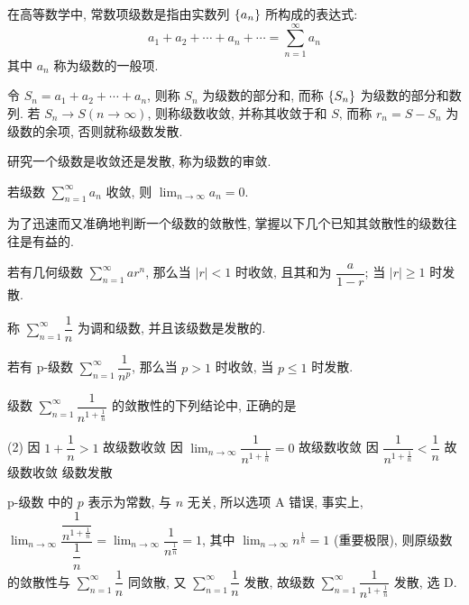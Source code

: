 在高等数学中, 常数项级数是指由实数列 $\qty{a_n}$ 所构成的表达式:
$$a_1+a_2+\cdots+a_n+\cdots=\sum_{n=1}^{\infty}a_n$$
其中 $a_n$ 称为级数的一般项.

令 $S_n=a_1+a_2+\cdots+a_n$, 则称 $S_n$ 为级数的部分和, 而称 $\qty{S_n}$ 为级数的部分和数列.
若 $S_n\to S(n\to\infty)$, 则称级数收敛, 并称其收敛于和 $S$, 而称 $r_n=S-S_n$ 为级数的余项, 
否则就称级数发散.

研究一个级数是收敛还是发散, 称为级数的审敛.
\begin{theorem}[级数收敛的必要条件]
    若级数 $\displaystyle\sum_{n=1}^{\infty}a_n$ 收敛, 则 $\displaystyle\lim_{n\to\infty}a_n=0$.
\end{theorem}

为了迅速而又准确地判断一个级数的敛散性, 掌握以下几个已知其敛散性的级数往往是有益的.

\begin{theorem}[几何级数]
    若有几何级数 $\displaystyle\sum_{n=1}^{\infty}ar^n$, 那么当 $|r|<1$ 时收敛, 且其和为 $\dfrac{a}{1-r}$; 当 $|r|\geqslant 1$ 时发散.
\end{theorem}

\begin{theorem}[调和级数]
    称 $\displaystyle\sum_{n=1}^{\infty}\dfrac{1}{n}$ 为调和级数, 并且该级数是发散的.
\end{theorem}

\begin{theorem}[p-级数]
    若有 p-级数 $\displaystyle\sum_{n=1}^{\infty}\dfrac{1}{n^p}$, 那么当 $p>1$ 时收敛, 当 $p\leqslant 1$ 时发散.
\end{theorem}

\begin{example}
    级数 $\displaystyle\sum_{n=1}^{\infty}\dfrac{1}{n^{1+\frac{1}{n}}}$ 的敛散性的下列结论中, 正确的是 
    \begin{tasks}(2)
        \task 因 $1+\dfrac{1}{n}>1$ 故级数收敛
        \task 因 $\displaystyle\lim_{n\to\infty}\dfrac{1}{n^{1+\frac{1}{n}}}=0$ 故级数收敛
        \task 因 $\dfrac{1}{n^{1+\frac{1}{n}}}<\dfrac{1}{n}$ 故级数收敛
        \task 级数发散
        \end{tasks}
\end{example}
\begin{solution}
    p-级数 中的 $p$ 表示为常数, 与 $n$ 无关, 所以选项 A 错误, 事实上, $\displaystyle \lim_{n\to\infty}\dfrac{\dfrac{1}{n^{1+\frac{1}{n}}}}{\dfrac{1}{n}}=\lim_{n\to\infty}\dfrac{1}{n^{\frac{1}{n}}}=1$, 其中 $\displaystyle\lim_{n\to\infty}n^{\frac{1}{n}}=1$ (重要极限), 
    则原级数的敛散性与 $\displaystyle\sum_{n=1}^{\infty}\dfrac{1}{n}$ 同敛散, 又 $\displaystyle\sum_{n=1}^{\infty}\dfrac{1}{n}$ 发散, 故级数 $\displaystyle\sum_{n=1}^{\infty}\dfrac{1}{n^{1+\frac{1}{n}}}$ 发散, 选 D.
\end{solution}

